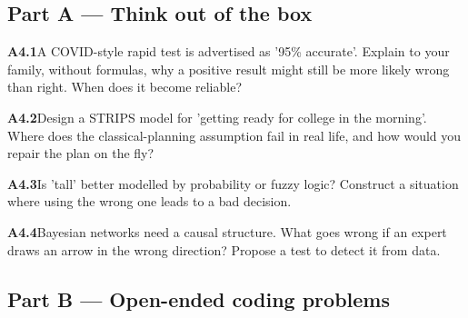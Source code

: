 \documentclass[11pt]{article}
\begin{document}
\subsection*{\color{navy}Part A --- Think out of the box}
\begin{tcolorbox}[enhanced,colback=goldL,colframe=gold!80!black,arc=2mm,boxrule=0.8pt,left=3mm]
\textbf{\color{navy}A4.1}\quad A COVID-style rapid test is advertised as '95\% accurate'. Explain to your family, without formulas, why a positive result might still be more likely wrong than right. When does it become reliable?\hfill{}
\end{tcolorbox}
\begin{tcolorbox}[enhanced,colback=goldL,colframe=gold!80!black,arc=2mm,boxrule=0.8pt,left=3mm]
\textbf{\color{navy}A4.2}\quad Design a STRIPS model for 'getting ready for college in the morning'. Where does the classical-planning assumption fail in real life, and how would you repair the plan on the fly?\hfill{}
\end{tcolorbox}
\begin{tcolorbox}[enhanced,colback=goldL,colframe=gold!80!black,arc=2mm,boxrule=0.8pt,left=3mm]
\textbf{\color{navy}A4.3}\quad Is 'tall' better modelled by probability or fuzzy logic? Construct a situation where using the wrong one leads to a bad decision.\hfill{}
\end{tcolorbox}
\begin{tcolorbox}[enhanced,colback=goldL,colframe=gold!80!black,arc=2mm,boxrule=0.8pt,left=3mm]
\textbf{\color{navy}A4.4}\quad Bayesian networks need a causal structure. What goes wrong if an expert draws an arrow in the wrong direction? Propose a test to detect it from data.\hfill{}
\end{tcolorbox}
\subsection*{\color{navy}Part B --- Open-ended coding problems}
\end{document}
